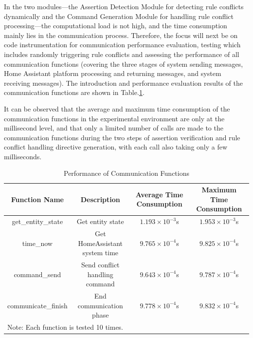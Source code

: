 In the two modules—the Assertion Detection Module for detecting rule conflicts dynamically and the Command Generation Module for handling rule conflict processing—the computational load is not high, and the time consumption mainly lies in the communication process. Therefore, the focus will next be on code instrumentation for communication performance evaluation, testing which includes randomly triggering rule conflicts and assessing the performance of all communication functions (covering the three stages of system sending messages, Home Assistant platform processing and returning messages, and system receiving messages). The introduction and performance evaluation results of the communication functions are shown in Table.\ref{performance_communication_function}.

It can be observed that the average and maximum time consumption of the communication functions in the experimental environment are only at the millisecond level, and that only a limited number of calls are made to the communication functions during the two steps of assertion verification and rule conflict handling directive generation, with each call also taking only a few milliseconds.

\begin{table}[htpb]
	\caption{Performance of Communication Functions}
	\label{performance_communication_function}
	\centering
	\begin{adjustbox}{width=0.95\textwidth}
		\begin{tabular}{c|c|c|c}
			\hline
			\textbf{Function Name} & \textbf{Description} & \textbf{Average Time Consumption} & \textbf{Maximum Time Consumption}\\
			\hline
			get\_entity\_state & Get entity state & $1.193 \times 10^{-3}$s & $1.953 \times 10^{-3}$s \\
			\hline
			time\_now & Get HomeAssistant system time & $9.765 \times 10^{-4}$s & $9.825 \times 10^{-4}$s \\
			\hline
			command\_send & Send conflict handling command & $9.643 \times 10^{-4}$s & $9.787 \times 10^{-4}$s \\
			\hline
			communicate\_finish & End communication phase & $9.778 \times 10^{-4}$s & $9.832 \times 10^{-4}$s \\
			\hline
			\multicolumn{4}{l}{Note: Each function is tested 10 times.} \\
		\end{tabular}
	\end{adjustbox}
\end{table}